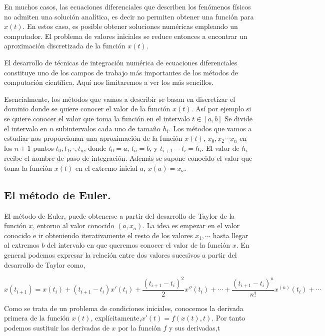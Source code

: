 En muchos casos, las ecuaciones diferenciales que describen los fenómenos físicos no admiten una solución analítica, es decir no permiten obtener una función para $x(t)$. En estos caso, es posible obtener soluciones numéricas empleando un computador. El problema de valores iniciales se reduce entonces a encontrar un aproximación discretizada de la función $x(t)$. 

El desarrollo de técnicas de integración numérica de ecuaciones diferenciales constituye uno de los campos de trabajo más importantes de los métodos de computación científica. Aquí nos limitaremos a ver los más sencillos.

Esencialmente, los métodos que vamos a describir se basan en discretizar el dominio donde se quiere conocer el valor de la función $x(t)$. Así por ejemplo si se quiere conocer el valor que toma la función en el intervalo $t \in [a,b]$ Se divide el intervalo en $n$ subintervalos cada uno de tamaño $h_i$. Los métodos que vamos a estudiar nos proporcionan una aproximación de la función $x(t)$, $x_0,x_2\cdots x_n$ en los $n+1$ puntos $t_0,t_1,\cdot, t_n$, donde $t_0=a$, $t_n=b$, y $t_{i+1}-t_i=h_i$. El valor de $h_i$ recibe el nombre de paso de integración. Además se supone conocido el valor que toma la función $x(t)$ en el extremo inicial $a$, $x(a)=x_a$.
  
\subsection{El método de Euler.}
El método de Euler, puede obtenerse a partir del desarrollo de Taylor de la función $x$, entorno al valor conocido $(a,x_a)$. La idea es empezar en el valor conocido e ir obteniendo iterativamente el resto de los valores $x_1,\cdots$ hasta llegar al extremos $b$ del intervalo en que queremos conocer el valor de la función $x$. En general podemos expresar la relación entre dos valores sucesivos a partir del desarrollo de Taylor como, 

\begin{equation*}
x(t_{i+1})=x(t_i)+(t_{i+1}-t_{i})x'(t_i)+\frac{(t_{i+1}-t_{i})^2}{2}x''(t_i)+\cdots+ \frac{(t_{i+1}-t_i)^n}{n!}x^{(n)}(t_i)+\cdots
\end{equation*}

Como se trata de un problema de condiciones iniciales, conocemos la derivada primera de la función $x(t)$, explícitamente,$x'(t)=f(x(t),t)$. Por tanto podemos sustituir las derivadas de $x$ por la función $f$ y sus derivadas,t


